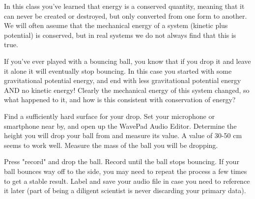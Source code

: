\label{lab:ballbounce}

\apparatus
{}


\introduction

In this class you've learned that energy is a conserved quantity, meaning that it can never be created or destroyed, but only converted from one form to another. We will often assume that the mechanical energy of a system (kinetic plus potential) is conserved, but in real systems we do not always find that this is true. 

If you've ever played with a bouncing ball, you know that if you drop it and leave it alone it will eventually stop bouncing.  In this case you started with some gravitational potential energy, and end with less gravitational potential energy AND no kinetic energy! Clearly the mechanical energy of this system changed, so what happened to it, and how is this consistent with conservation of energy?

\observations

Find a sufficiently hard surface for your drop. Set your microphone or smartphone near by, and open up the WavePad Audio Editor. Determine the height you will drop your ball from and measure its value.  A value of 30-50 cm seems to work well. Measure the mass of the ball you will be dropping.

Press "record" and drop the ball. Record until the ball stops bouncing.  If your ball bounces way off to the side, you may need to repeat the process a few times to get a stable result. Label and save your audio file in case you need to reference it later (part of being a diligent scientist is never discarding your primary data).  


